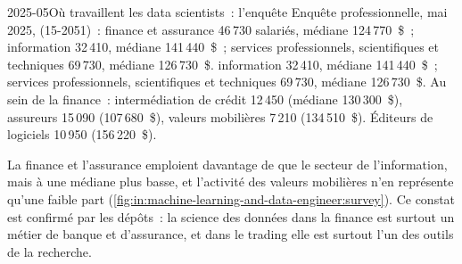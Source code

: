 \begin{omfigure}

\label{fig:in:machine-learning-and-data-engineer:gap}
\end{omfigure}

\begin{dated}{2025-05}{Où travaillent les data scientists~: l'enquête}\label{dat:in:machine-learning-and-data-engineer:survey}
Enquête professionnelle, mai 2025,  (15-2051)~: finance et assurance 46\,730 salariés, médiane 124\,770~\$~; information 32\,410, médiane 141\,440~\$~; services professionnels, scientifiques et techniques 69\,730, médiane 126\,730~\$.
information 32\,410, médiane 141\,440~\$~; services professionnels, scientifiques et techniques 69\,730, médiane 126\,730~\$.
Au sein de la finance~: intermédiation de crédit 12\,450 (médiane 130\,300~\$), assureurs 15\,090 (107\,680~\$), valeurs mobilières
7\,210 (134\,510~\$). Éditeurs de logiciels 10\,950 (156\,220~\$).
\end{dated}

La finance et l'assurance emploient davantage de  que le secteur de l'information, mais à une médiane plus basse, et
l'activité des valeurs mobilières n'en représente qu'une faible part (\cref{fig:in:machine-learning-and-data-engineer:survey}). Ce constat
est confirmé par les dépôts~: la science des données dans la finance est surtout un métier de banque et d'assurance, et dans le trading elle est
surtout l'un des outils de la recherche.

